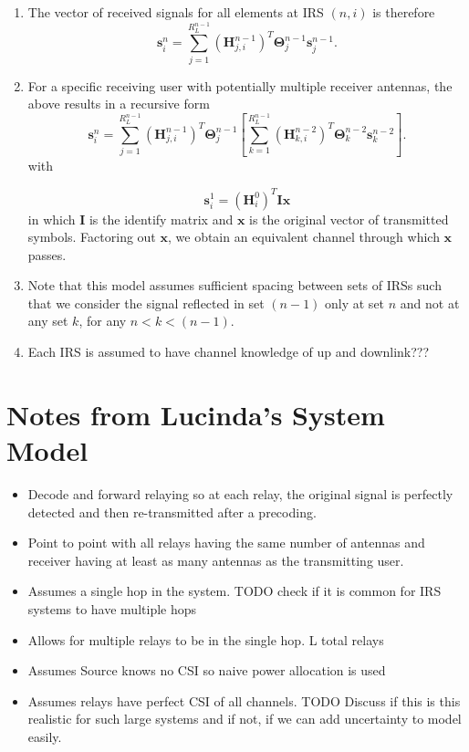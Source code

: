 \documentclass[12pt,a4paper]{report}
\begin{document}
\begin{enumerate}
\item
The vector of received signals for all elements at IRS $(n,i)$ is therefore
\begin{equation}
\mathbf{s}^{n}_{i} = \sum_{j = 1}^{R^{n-1}_L} (\mathbf{H}^{n-1}_{j,i})^T\boldsymbol{\Theta}^{n-1}_{j}\mathbf{s}^{n-1}_{j}.
\end{equation}



\item For a specific receiving user with potentially multiple receiver antennas, the above results in a recursive form
\begin{equation}
\mathbf{s}^{n}_{i} = \sum_{j = 1}^{R^{n-1}_L} (\mathbf{H}^{n-1}_{j,i})^T\boldsymbol{\Theta}^{n-1}_{j} \left[
\sum_{k = 1}^{R^{n-1}_L} (\mathbf{H}^{n-2}_{k,i})^T\boldsymbol{\Theta}^{n-2}_{k}\mathbf{s}^{n-2}_{k} \right].
\end{equation}
with 

\begin{equation}
\mathbf{s}^{1}_{i} = (\mathbf{H}^{0}_{i})^T\boldsymbol{I}\mathbf{x}
\end{equation}
 in which $\boldsymbol{I}$ is the identify matrix and $\mathbf{x}$ is the original vector of transmitted symbols.
 Factoring out $\mathbf{x}$, we obtain an equivalent channel through which $\mathbf{x}$ passes.
  
\item
	Note that this model assumes sufficient spacing between sets of IRSs such that we consider the signal reflected in set $(n-1)$ only at set $n$ and not at any set $k$, for any $n<k<(n-1)$.
\item
	Each IRS is assumed to have channel knowledge of up and downlink???

\end{enumerate}


\section{Notes from Lucinda's System Model}
\begin{itemize}
\item Decode and forward relaying so at each relay, the original signal is perfectly detected and then re-transmitted after a precoding. 
\item Point to point with all relays having the same number of antennas and receiver having at least as many antennas as the transmitting user.
\item Assumes a single hop in the system. TODO check if it is common for IRS systems to have multiple hops
\item Allows for multiple relays to be in the single hop. L total relays
\item Assumes Source knows no CSI so naive power allocation is used
\item Assumes relays have perfect CSI of all channels. TODO Discuss if this is this realistic for such large systems and if not, if we can add uncertainty to model easily.
\end{itemize}
\end{document}
